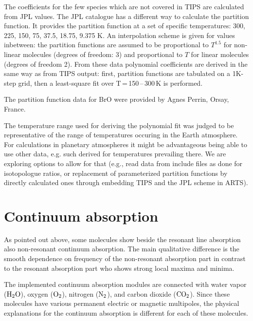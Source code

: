 The coefficients for the few species which are not covered in
TIPS are calculated from JPL values. The JPL catalogue has a
different way to calculate the partition function. It provides the
partition function at a set of specific temperatures: 300, 225, 150, 75, 37.5,
18.75, 9.375 K. An interpolation scheme is given for values
inbetween: the partition functions are assumed to be proportional to $T^{1.5}$
for non-linear molecules (degrees of freedom: 3) and proportional to $T$ for
linear molecules (degrees of freedom 2).
From these data polynomial coefficients are derived in the same way as from TIPS
output: first, partition functions are tabulated on a 1K-step grid, then a
least-square fit over T\,=\,150\,--\,300\,K is performed.

The partition function data for BrO were provided by Agnes
Perrin, Orsay, France.

The temperature range used for deriving the polynomial fit was judged to be
representative of the range of temperatures occuring in the Earth atmosphere.
For calculations in planetary atmospheres it might be advantageous being able to
use other data, e.g. such derived for temperatures prevailing there. We are
exploring options to allow for that (e.g., read data from include files as
done for isotopologue ratios, or replacement of parameterized partition
functions by directly calculated ones through embedding TIPS and the JPL scheme
in ARTS).


\section{Continuum absorption}
\label{sec:abs_theory:ContAbs}

As pointed out above, some molecules show beside the resonant line
absorption also non-resonant continuum absorption. The main qualitative
difference is the smooth dependence on frequency of the non-resonant
absorption part in contrast to the resonant absorption part who shows 
strong local maxima and minima.

The implemented continuum absorption modules are connected with water
vapor ($\mbox{H}_2\mbox{O}$), oxygen ($\mbox{O}_2$), nitrogen ($\mbox{N}_2$), and carbon dioxide
($\mbox{CO}_2$). Since these molecules have various permanent electric or magnetic
multipoles, the physical explanations for the continuum absorption is 
different for each of these molecules.

